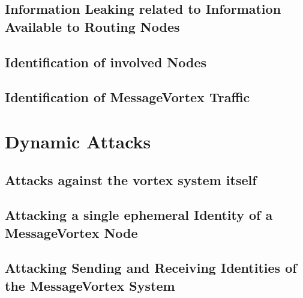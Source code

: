 \subsection{Information Leaking related to Information Available to Routing Nodes}
\subsection{Identification of involved Nodes}
\subsection{Identification of MessageVortex Traffic}
\section{Dynamic Attacks}
\subsection{Attacks against the vortex system itself}
\subsection{Attacking a single ephemeral Identity of a MessageVortex Node}
\subsection{Attacking Sending and Receiving Identities of the MessageVortex System}
